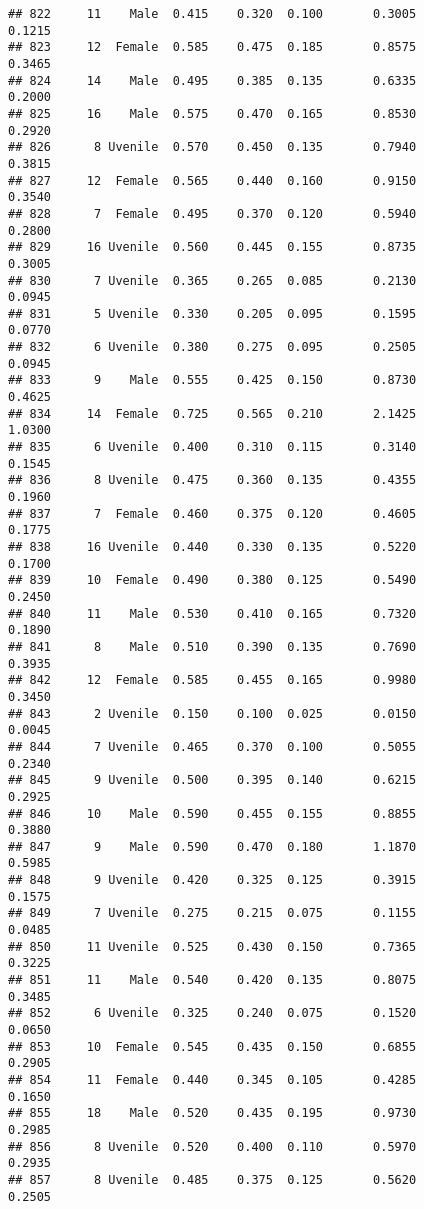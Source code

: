 \documentclass[
]{article}
\begin{document}
\begin{verbatim}
## 822     11    Male  0.415    0.320  0.100       0.3005         0.1215
## 823     12  Female  0.585    0.475  0.185       0.8575         0.3465
## 824     14    Male  0.495    0.385  0.135       0.6335         0.2000
## 825     16    Male  0.575    0.470  0.165       0.8530         0.2920
## 826      8 Uvenile  0.570    0.450  0.135       0.7940         0.3815
## 827     12  Female  0.565    0.440  0.160       0.9150         0.3540
## 828      7  Female  0.495    0.370  0.120       0.5940         0.2800
## 829     16 Uvenile  0.560    0.445  0.155       0.8735         0.3005
## 830      7 Uvenile  0.365    0.265  0.085       0.2130         0.0945
## 831      5 Uvenile  0.330    0.205  0.095       0.1595         0.0770
## 832      6 Uvenile  0.380    0.275  0.095       0.2505         0.0945
## 833      9    Male  0.555    0.425  0.150       0.8730         0.4625
## 834     14  Female  0.725    0.565  0.210       2.1425         1.0300
## 835      6 Uvenile  0.400    0.310  0.115       0.3140         0.1545
## 836      8 Uvenile  0.475    0.360  0.135       0.4355         0.1960
## 837      7  Female  0.460    0.375  0.120       0.4605         0.1775
## 838     16 Uvenile  0.440    0.330  0.135       0.5220         0.1700
## 839     10  Female  0.490    0.380  0.125       0.5490         0.2450
## 840     11    Male  0.530    0.410  0.165       0.7320         0.1890
## 841      8    Male  0.510    0.390  0.135       0.7690         0.3935
## 842     12  Female  0.585    0.455  0.165       0.9980         0.3450
## 843      2 Uvenile  0.150    0.100  0.025       0.0150         0.0045
## 844      7 Uvenile  0.465    0.370  0.100       0.5055         0.2340
## 845      9 Uvenile  0.500    0.395  0.140       0.6215         0.2925
## 846     10    Male  0.590    0.455  0.155       0.8855         0.3880
## 847      9    Male  0.590    0.470  0.180       1.1870         0.5985
## 848      9 Uvenile  0.420    0.325  0.125       0.3915         0.1575
## 849      7 Uvenile  0.275    0.215  0.075       0.1155         0.0485
## 850     11 Uvenile  0.525    0.430  0.150       0.7365         0.3225
## 851     11    Male  0.540    0.420  0.135       0.8075         0.3485
## 852      6 Uvenile  0.325    0.240  0.075       0.1520         0.0650
## 853     10  Female  0.545    0.435  0.150       0.6855         0.2905
## 854     11  Female  0.440    0.345  0.105       0.4285         0.1650
## 855     18    Male  0.520    0.435  0.195       0.9730         0.2985
## 856      8 Uvenile  0.520    0.400  0.110       0.5970         0.2935
## 857      8 Uvenile  0.485    0.375  0.125       0.5620         0.2505

\end{verbatim}
\end{document}
